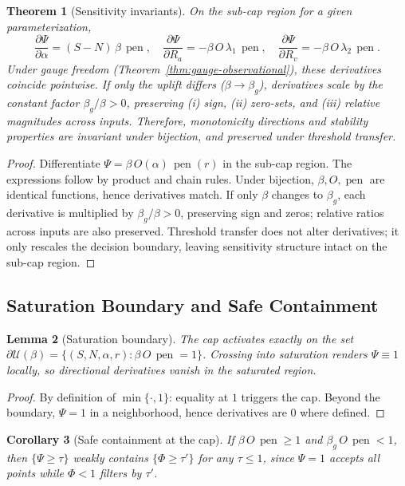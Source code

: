 \documentclass[12pt,a4paper]{article}
\newtheorem{theorem}{Theorem}
\newtheorem{lemma}[theorem]{Lemma}
\newtheorem{corollary}[theorem]{Corollary}
\begin{document}
\begin{theorem}[Sensitivity invariants]\label{thm:sensitivity-invariants}
On the sub-cap region for a given parameterization,
\[
\frac{\partial \Psi}{\partial \alpha} = (S-N)\,\beta\,\operatorname{pen},\quad
\frac{\partial \Psi}{\partial R_a} = -\beta\,O\,\lambda_1\,\operatorname{pen},\quad
\frac{\partial \Psi}{\partial R_v} = -\beta\,O\,\lambda_2\,\operatorname{pen}.
\]
Under gauge freedom (Theorem~\ref{thm:gauge-observational}), these derivatives coincide pointwise. If only the uplift differs ($\beta\to\beta_g$), derivatives scale by the constant factor $\beta_g/\beta>0$, preserving (i) sign, (ii) zero-sets, and (iii) relative magnitudes across inputs. Therefore, monotonicity directions and stability properties are invariant under bijection, and preserved under threshold transfer.
\end{theorem}
\begin{proof}
Differentiate $\Psi = \beta\,O(\alpha)\,\operatorname{pen}(r)$ in the sub-cap region. The expressions follow by product and chain rules. Under bijection, $\beta,O,\operatorname{pen}$ are identical functions, hence derivatives match. If only $\beta$ changes to $\beta_g$, each derivative is multiplied by $\beta_g/\beta>0$, preserving sign and zeros; relative ratios across inputs are also preserved. Threshold transfer does not alter derivatives; it only rescales the decision boundary, leaving sensitivity structure intact on the sub-cap region.
\end{proof}

\subsection{Saturation Boundary and Safe Containment}
\begin{lemma}[Saturation boundary]\label{lem:saturation}
The cap activates exactly on the set $\partial\mathcal{U}(\beta) = \{(S,N,\alpha,r) : \beta\,O\,\operatorname{pen} = 1\}$. Crossing into saturation renders $\Psi\equiv 1$ locally, so directional derivatives vanish in the saturated region.
\end{lemma}
\begin{proof}
By definition of $\min\{\cdot,1\}$: equality at $1$ triggers the cap. Beyond the boundary, $\Psi=1$ in a neighborhood, hence derivatives are $0$ where defined.
\end{proof}

\begin{corollary}[Safe containment at the cap]\label{cor:safe-containment}
If $\beta\,O\,\operatorname{pen} \ge 1$ and $\beta_g\,O\,\operatorname{pen} < 1$, then $\{\Psi \ge \tau\}$ weakly contains $\{\Phi \ge \tau'\}$ for any $\tau\le 1$, since $\Psi=1$ accepts all points while $\Phi<1$ filters by $\tau'$.
\end{corollary}
\end{document}
